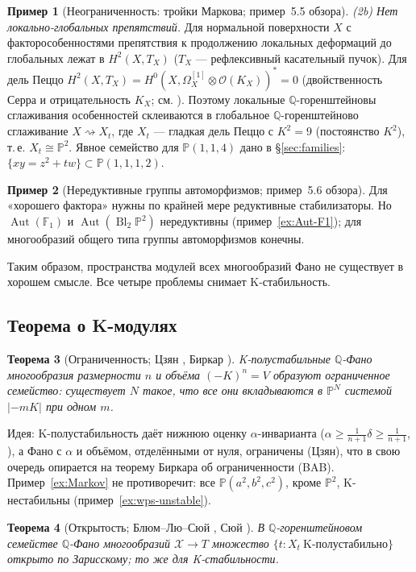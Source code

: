 \documentclass[11pt,a4paper]{article}
\theoremstyle{plain}
\newtheorem{theorem}{Теорема}[section]
\theoremstyle{definition}
\newtheorem{example}[theorem]{Пример}
\theoremstyle{remark}
\newcommand{\Q}{\mathbb{Q}}
\newcommand{\PP}{\mathbb{P}}
\newcommand{\cO}{\mathcal{O}}
\newcommand{\cX}{\mathcal{X}}
\DeclareMathOperator{\Bl}{Bl}
\DeclareMathOperator{\Aut}{Aut}
\begin{document}
\begin{example}[Неограниченность: тройки Маркова; пример~5.5 обзора]
\emph{(2b) Нет локально-глобальных препятствий.} Для нормальной поверхности $X$ с
факторособенностями препятствия к продолжению локальных деформаций до глобальных лежат в
$H^2(X,T_X)$ ($T_X$ --- рефлексивный касательный пучок). Для дель Пеццо $H^2(X,T_X)=H^0(X,\Omega^{[1]}_X\otimes\cO(K_X))^*=0$
(двойственность Серра и отрицательность $K_X$; см. \cite[Prop.~3.1]{HP}). Поэтому локальные
$\Q$-горенштейновы сглаживания особенностей склеиваются в глобальное $\Q$-горенштейново сглаживание
$X\rightsquigarrow X_t$, где $X_t$ --- гладкая дель Пеццо с $K^2=9$ (постоянство $K^2$), т.\,е.
$X_t\cong\PP^2$. Явное семейство для $\PP(1,1,4)$ дано в \S\ref{sec:families}: $\{xy=z^2+tw\}\subset\PP(1,1,1,2)$.
\end{example}

\begin{example}[Нередуктивные группы автоморфизмов; пример~5.6 обзора]
Для «хорошего фактора» нужны по крайней мере редуктивные стабилизаторы. Но $\Aut(\mathbb F_1)$ и
$\Aut(\Bl_2\PP^2)$ нередуктивны (пример~\ref{ex:Aut-F1}); для многообразий общего типа группы
автоморфизмов конечны.
\end{example}

Таким образом, пространства модулей всех многообразий Фано не существует в хорошем смысле. Все четыре
проблемы снимает K-стабильность.

\subsection{Теорема о K-модулях}

\begin{theorem}[{Ограниченность; Цзян \cite{Jia20}, Биркар \cite{Bir19}}]\label{thm:boundedness}
K-полустабильные $\Q$-Фано многообразия размерности $n$ и объёма $(-K)^n=V$ образуют ограниченное
семейство: существует $N$ такое, что все они вкладываются в $\PP^N$ системой $|-mK|$ при одном $m$.
\end{theorem}

Идея: K-полустабильность даёт нижнюю оценку $\alpha$-инварианта ($\alpha\ge\frac1{n+1}\delta\ge\frac1{n+1}$,
\cite{BJ}), а Фано с $\alpha$ и объёмом, отделёнными от нуля, ограничены (Цзян), что в свою очередь
опирается на теорему Биркара об ограниченности (BAB). Пример~\ref{ex:Markov} не противоречит:
все $\PP(a^2,b^2,c^2)$, кроме $\PP^2$, K-нестабильны (пример~\ref{ex:wps-unstable}).

\begin{theorem}[{Открытость; Блюм--Лю--Сюй \cite{BLX}, Сюй \cite{Xu20}}]\label{thm:openness}
В $\Q$-горенштейновом семействе $\Q$-Фано многообразий $\cX\to T$ множество $\{t: X_t\ \text{K-полустабильно}\}$
открыто по Зарисскому; то же для K-стабильности.
\end{theorem}
\end{document}

